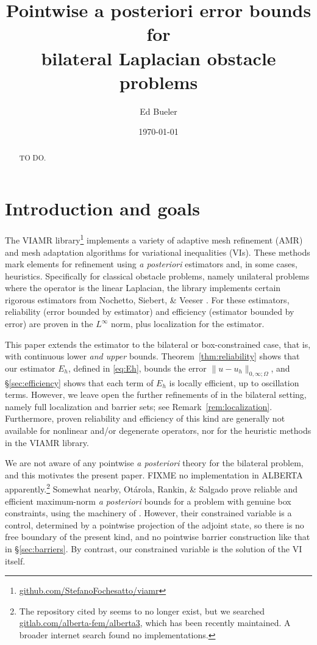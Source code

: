 \documentclass[12pt]{amsart}
\title[Pointwise a posteriori bounds for bilateral obstacle problems]{Pointwise a posteriori error bounds for \\ bilateral Laplacian obstacle problems}
\author{Ed Bueler}
\date{\today}
\numberwithin{equation}{section}
\theoremstyle{plain}
\theoremstyle{definition}
\theoremstyle{remark}
\newcommand{\Om}{\Omega}
\begin{document}
\begin{abstract}
TO DO.
\end{abstract}

\maketitle

\section{Introduction and goals} \label{sec:intro}

The VIAMR library\footnote{\href{https://github.com/StefanoFochesatto/viamr}{github.com/StefanoFochesatto/viamr}} implements a variety of adaptive mesh refinement (AMR) and mesh adaptation algorithms for variational inequalities (VIs).  These methods mark elements for refinement using \emph{a posteriori} estimators and, in some cases, heuristics.  Specifically for classical obstacle problems, namely unilateral problems where the operator is the linear Laplacian, the library implements certain rigorous estimators from Nochetto, Siebert, \& Veeser \cite{NSV03,NSV05}.  For these estimators, reliability (error bounded by estimator) and efficiency (estimator bounded by error) are proven in the $L^\infty$ norm, plus localization for the \cite{NSV05} estimator.

This paper extends the \cite{NSV03} estimator to the bilateral or box-constrained case, that is, with continuous lower \emph{and upper} bounds.  Theorem~\ref{thm:reliability} shows that our estimator $E_h$, defined in \eqref{eq:Eh}, bounds the error $\|u-u_h\|_{0,\infty;\Om}$, and \S \ref{sec:efficiency} shows that each term of $E_h$ is locally efficient, up to oscillation terms.  However, we leave open the further refinements of \cite{NSV05} in the bilateral setting, namely full localization and barrier sets; see Remark~\ref{rem:localization}.  Furthermore, proven reliability and efficiency of this kind are generally not available for nonlinear and/or degenerate operators, nor for the heuristic methods in the VIAMR library.

We are not aware of any pointwise \emph{a posteriori} theory for the bilateral problem, and this motivates the present paper.  FIXME no implementation in ALBERTA apparently.\footnote{The repository cited by \cite{Siebert2011} seems to no longer exist, but we searched \href{https://gitlab.com/alberta-fem/alberta3}{gitlab.com/alberta-fem/alberta3}, which has been recently maintained.  A broader internet search found no implementations.}  Somewhat nearby, Ot\'arola, Rankin, \& Salgado \cite{Otarolaetal2019} prove reliable and efficient maximum-norm \emph{a posteriori} bounds for a problem with genuine box constraints, using the machinery of \cite{NSV03}.  However, their constrained variable is a control, determined by a pointwise projection of the adjoint state, so there is no free boundary of the present kind, and no pointwise barrier construction like that in \S \ref{sec:barriers}.  By contrast, our constrained variable is the solution of the VI itself.
\end{document}
